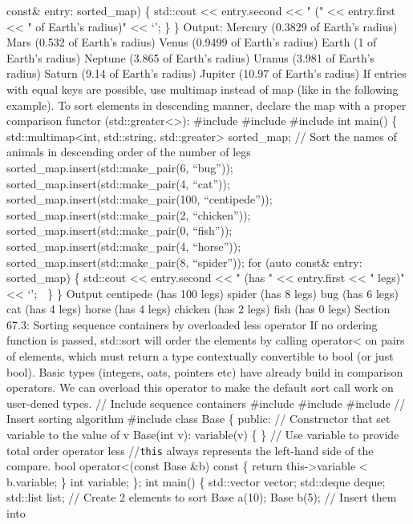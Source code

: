 const\& entry: sorted\_map) \{ std::cout \textless\textless{}
entry.second \textless\textless{} " (" \textless\textless{} entry.first
\textless\textless{} " of Earth's radius)" \textless\textless{} `\n'; \}
\} Output: Mercury (0.3829 of Earth's radius) Mars (0.532 of Earth's
radius) Venus (0.9499 of Earth's radius) Earth (1 of Earth's radius)
Neptune (3.865 of Earth's radius) Uranus (3.981 of Earth's radius)
Saturn (9.14 of Earth's radius) Jupiter (10.97 of Earth's radius) If
entries with equal keys are possible, use multimap instead of map (like
in the following example). To sort elements in descending manner,
declare the map with a proper comparison functor
(std::greater\textless\textgreater): \#include \#include \#include int
main() \{ std::multimap\textless int, std::string,
std::greater\textgreater{} sorted\_map; // Sort the names of animals in
descending order of the number of legs
sorted\_map.insert(std::make\_pair(6, ``bug''));
sorted\_map.insert(std::make\_pair(4, ``cat''));
sorted\_map.insert(std::make\_pair(100, ``centipede''));
sorted\_map.insert(std::make\_pair(2, ``chicken''));
sorted\_map.insert(std::make\_pair(0, ``fish''));
sorted\_map.insert(std::make\_pair(4, ``horse''));
sorted\_map.insert(std::make\_pair(8, ``spider'')); for (auto const\&
entry: sorted\_map) \{ std::cout \textless\textless{} entry.second
\textless\textless{} " (has " \textless\textless{} entry.first
\textless\textless{} " legs)" \textless\textless{} `\n';  \} \} Output
centipede (has 100 legs) spider (has 8 legs) bug (has 6 legs) cat (has 4
legs) horse (has 4 legs) chicken (has 2 legs) fish (has 0 legs) Section
67.3: Sorting sequence containers by overloaded less operator If no
ordering function is passed, std::sort will order the elements by
calling operator\textless{} on pairs of elements, which must return a
type contextually convertible to bool (or just bool). Basic types
(integers, oats, pointers etc) have already build in comparison
operators. We can overload this operator to make the default sort call
work on user-dened types. // Include sequence containers \#include
\#include \#include // Insert sorting algorithm \#include class Base \{
public: // Constructor that set variable to the value of v Base(int v):
variable(v) \{ \} // Use variable to provide total order operator less
//\passthrough{\lstinline!this!} always represents the left-hand side of
the compare. bool operator\textless(const Base \&b) const \{ return
this-\textgreater variable \textless{} b.variable; \} int variable; \};
int main() \{ std::vector vector; std::deque deque; std::list list; //
Create 2 elements to sort Base a(10); Base b(5); // Insert them into
